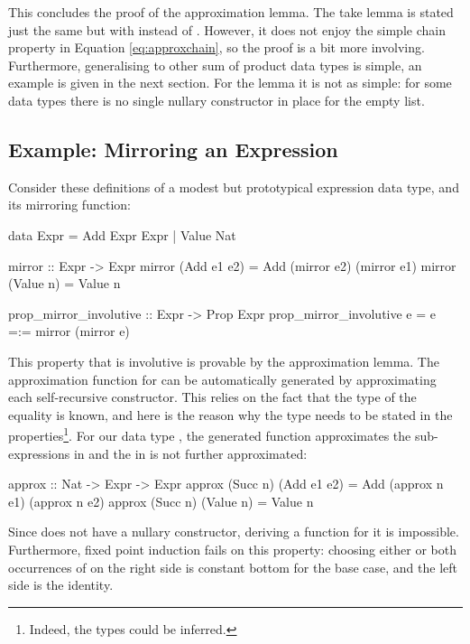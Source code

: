 This concludes the proof of the approximation lemma. The take lemma is
stated just the same but with  instead of
. However, it does not enjoy the simple chain property in
Equation \ref{eq:approxchain}, so the proof is a bit more involving.
Furthermore, generalising  to other sum of product
data types is simple, an example is given in the next section. For the
 lemma it is not as simple: for some data types there is no
single nullary constructor in place for the empty list.

\subsection{Example: Mirroring an Expression}

Consider these definitions of a modest but prototypical expression
data type, and its mirroring function:

\begin{code}
data Expr = Add Expr Expr | Value Nat

mirror :: Expr -> Expr
mirror (Add e1 e2) = Add (mirror e2) (mirror e1)
mirror (Value n)   = Value n

prop_mirror_involutive :: Expr -> Prop Expr
prop_mirror_involutive e = e =:= mirror (mirror e)
\end{code}

This property that  is involutive is provable by the
approximation lemma. The approximation function for  can be
automatically generated by approximating each self-recursive
constructor. This relies on the fact that the type of the equality is
known, and here is the reason why the type needs to be stated in the
properties\footnote{Indeed, the types could be inferred.}. For our
data type , the generated function approximates the
sub-expressions in  and the  in  is not
further approximated:

\begin{code}
approx :: Nat -> Expr -> Expr
approx (Succ n) (Add e1 e2) = Add (approx n e1) (approx n e2)
approx (Succ n) (Value n)   = Value n
\end{code}

Since  does not have a nullary constructor, deriving a
 function for it is impossible. Furthermore, fixed point
induction fails on this property: choosing either or both occurrences
of  on the right side is constant bottom for the base case,
and the left side is the identity.

